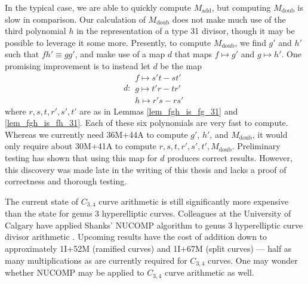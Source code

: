 In the typical case, we are able to quickly compute $M_{\text{add}}$, but computing $M_{\text{doub}}$ is slow in comparison.
Our calculation of $M_{\text{doub}}$ does not make much use of the third polynomial $h$ in the representation of a type 31 divisor,
though it may be possible to leverage it some more.
Presently, to compute $M_{\text{doub}}$, we find $g'$ and $h'$ such that $fh' \equiv gg'$,
and make use of a map $d$ that maps $f \mapsto g'$ and $g \mapsto h'$.
One promising improvement is to instead let $d$ be the map
\[ d : \begin{array}{l}
  f \mapsto s't - st' \\
  g \mapsto t'r - tr' \\
  h \mapsto r's - rs'
\end{array} \]
where $r, s, t, r', s', t'$ are as in Lemmas \ref{lem_fgh_is_fg_31} and \ref{lem_fgh_is_fh_31}.
Each of these six polynomials are very fast to compute.
Whereas we currently need 36M+44A to compute $g'$, $h'$, and $M_{\text{doub}}$,
it would only require about 30M+41A to compute $r,s,t,r',s',t',M_{\text{doub}}$.
Preliminary testing has shown that using this map for $d$ produces correct results.
However, this discovery was made late in the writing of this thesis
and lacks a proof of correctness and thorough testing.

The current state of $C_{3,4}$ curve arithmetic is still significantly
more expensive than the state for genus 3 hyperelliptic curves.
Colleagues at the University of Calgary have applied Shanks' NUCOMP algorithm \cite{shanks89}
to genus 3 hyperelliptic curve divisor arithmetic \cite{jacobson07}.
Upcoming results  have the cost of addition down to
approximately 1I+52M (ramified curves) and 1I+67M (split curves) ---
half as many multiplications as are currently required for $C_{3,4}$ curves.
One may wonder whether NUCOMP may be applied to $C_{3,4}$ curve arithmetic as well.
